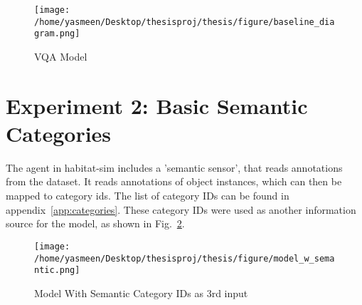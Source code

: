 \begin{figure}[h]
     \centering
     \texttt{[image: /home/yasmeen/Desktop/thesisproj/thesis/figure/baseline\_diagram.png]}
     \caption{VQA Model}
     \label{fig:baseline_model}
\end{figure}

\section{Experiment 2: Basic Semantic Categories}
\label{sec:exp_2}
The agent in habitat-sim includes a 'semantic sensor', that reads annotations from the dataset. It reads annotations of object instances, which can then be mapped to category ids. The list of category IDs can be found in appendix~\ref{app:categories}. These category IDs were used as another information source for the model, as shown in Fig.~\ref{fig:category_model}.

\begin{figure}[h]
     \centering
     \texttt{[image: /home/yasmeen/Desktop/thesisproj/thesis/figure/model\_w\_semantic.png]}
     \caption{Model With Semantic Category IDs as 3rd input}
     \label{fig:category_model}
\end{figure}

